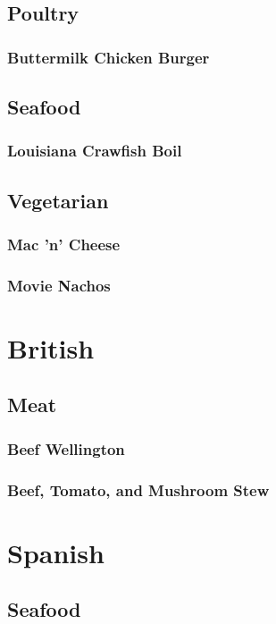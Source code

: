 \documentclass[a4paper, oneside]{book}
\begin{document}
\section{Poultry}

\subsection{Buttermilk Chicken Burger}

\section{Seafood}

\subsection{Louisiana Crawfish Boil}

\section{Vegetarian}

\subsection{Mac 'n' Cheese}

\subsection{Movie Nachos}


\chapter{British}
\section{Meat}
\subsection{Beef Wellington}
\subsection{Beef, Tomato, and Mushroom Stew}

\chapter{Spanish}
\section{Seafood}
\end{document}
